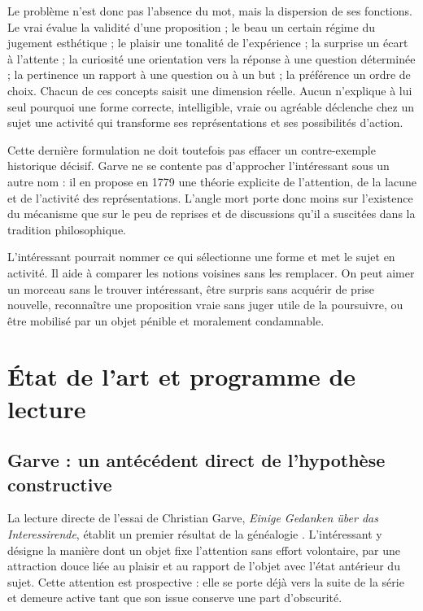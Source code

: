 \documentclass[11pt,a4paper]{article}
\begin{document}
Le problème n'est donc pas l'absence du mot, mais la dispersion de ses fonctions.
Le vrai évalue la validité d'une proposition ;
le beau un certain régime du jugement esthétique ; le plaisir une tonalité de
l'expérience ; la surprise un écart à l'attente ; la curiosité une orientation
vers la réponse à une question déterminée ; la pertinence un rapport à une question ou à
un but ; la préférence un ordre de choix. Chacun de ces concepts saisit une
dimension réelle. Aucun n'explique à lui seul pourquoi une forme correcte,
intelligible, vraie ou agréable déclenche chez un sujet une activité qui
transforme ses représentations et ses possibilités d'action.

Cette dernière formulation ne doit toutefois pas effacer un contre-exemple
historique décisif. Garve ne se contente pas d'approcher l'intéressant sous un
autre nom : il en propose en 1779 une théorie explicite de l'attention, de la
lacune et de l'activité des représentations. L'angle mort porte donc moins sur
l'existence du mécanisme que sur le peu de reprises et de discussions qu'il a
suscitées dans la tradition philosophique.

L'intéressant pourrait nommer ce qui sélectionne une forme et met le sujet en
activité. Il aide à comparer les notions voisines sans les remplacer. On peut
aimer un morceau sans le trouver intéressant, être
surpris sans acquérir de prise nouvelle, reconnaître une proposition vraie sans
juger utile de la poursuivre, ou être mobilisé par un objet pénible et
moralement condamnable.

\section{État de l'art et programme de lecture}

\subsection{Garve : un antécédent direct de l'hypothèse constructive}

La lecture directe de l'essai de Christian Garve, \emph{Einige Gedanken über
das Interessirende}, établit un premier résultat de la généalogie
\parencite[253--274, 313--317]{garve1779interessirende}. L'intéressant y désigne
la manière dont un objet fixe l'attention sans effort volontaire, par une
attraction douce liée au plaisir et au rapport de l'objet avec l'état antérieur
du sujet. Cette attention est prospective : elle se porte déjà vers la suite de
la série et demeure active tant que son issue conserve une part d'obscurité.
\end{document}
